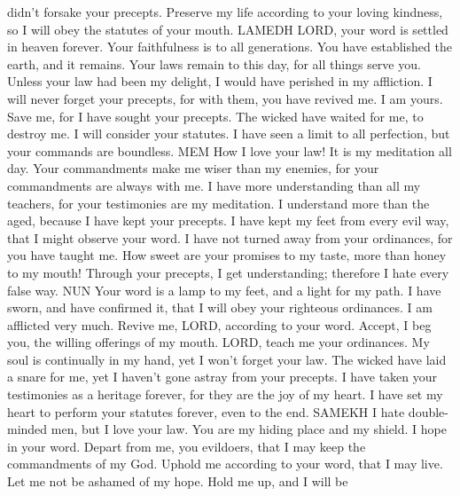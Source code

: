 didn't forsake your precepts.  Preserve my life according
to your loving kindness, so I will obey the statutes of your mouth.
LAMEDH  LORD, your word is settled in heaven forever.
 Your faithfulness is to all generations. You have
established the earth, and it remains.  Your laws remain
to this day, for all things serve you.  Unless your law
had been my delight, I would have perished in my affliction.
 I will never forget your precepts, for with them, you
have revived me.  I am yours. Save me, for I have sought
your precepts.  The wicked have waited for me, to destroy
me. I will consider your statutes.  I have seen a limit
to all perfection, but your commands are boundless. MEM 
How I love your law! It is my meditation all day.  Your
commandments make me wiser than my enemies, for your commandments are
always with me.  I have more understanding than all my
teachers, for your testimonies are my meditation.  I
understand more than the aged, because I have kept your precepts.
 I have kept my feet from every evil way, that I might
observe your word.  I have not turned away from your
ordinances, for you have taught me.  How sweet are your
promises to my taste, more than honey to my mouth! 
Through your precepts, I get understanding; therefore I hate every false
way. NUN  Your word is a lamp to my feet, and a light
for my path.  I have sworn, and have confirmed it, that
I will obey your righteous ordinances.  I am afflicted
very much. Revive me, LORD, according to your word. 
Accept, I beg you, the willing offerings of my mouth. LORD, teach me
your ordinances.  My soul is continually in my hand, yet
I won't forget your law.  The wicked have laid a snare
for me, yet I haven't gone astray from your precepts.  I
have taken your testimonies as a heritage forever, for they are the joy
of my heart.  I have set my heart to perform your
statutes forever, even to the end. SAMEKH  I hate
double-minded men, but I love your law.  You are my
hiding place and my shield. I hope in your word.  Depart
from me, you evildoers, that I may keep the commandments of my God.
 Uphold me according to your word, that I may live. Let
me not be ashamed of my hope.  Hold me up, and I will be
